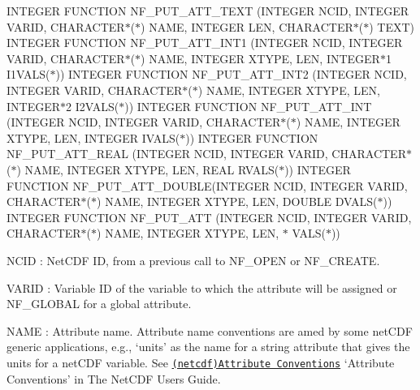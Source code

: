 I\+N\+T\+E\+G\+ER F\+U\+N\+C\+T\+I\+ON N\+F\+\_\+\+P\+U\+T\+\_\+\+A\+T\+T\+\_\+\+T\+E\+XT (I\+N\+T\+E\+G\+ER N\+C\+ID, I\+N\+T\+E\+G\+ER V\+A\+R\+ID, C\+H\+A\+R\+A\+C\+T\+E\+R$\ast$($\ast$) N\+A\+ME, I\+N\+T\+E\+G\+ER L\+EN, C\+H\+A\+R\+A\+C\+T\+E\+R$\ast$($\ast$) T\+E\+XT) I\+N\+T\+E\+G\+ER F\+U\+N\+C\+T\+I\+ON N\+F\+\_\+\+P\+U\+T\+\_\+\+A\+T\+T\+\_\+\+I\+N\+T1 (I\+N\+T\+E\+G\+ER N\+C\+ID, I\+N\+T\+E\+G\+ER V\+A\+R\+ID, C\+H\+A\+R\+A\+C\+T\+E\+R$\ast$($\ast$) N\+A\+ME, I\+N\+T\+E\+G\+ER X\+T\+Y\+PE, L\+EN, I\+N\+T\+E\+G\+E\+R$\ast$1 I1\+V\+A\+L\+S($\ast$)) I\+N\+T\+E\+G\+ER F\+U\+N\+C\+T\+I\+ON N\+F\+\_\+\+P\+U\+T\+\_\+\+A\+T\+T\+\_\+\+I\+N\+T2 (I\+N\+T\+E\+G\+ER N\+C\+ID, I\+N\+T\+E\+G\+ER V\+A\+R\+ID, C\+H\+A\+R\+A\+C\+T\+E\+R$\ast$($\ast$) N\+A\+ME, I\+N\+T\+E\+G\+ER X\+T\+Y\+PE, L\+EN, I\+N\+T\+E\+G\+E\+R$\ast$2 I2\+V\+A\+L\+S($\ast$)) I\+N\+T\+E\+G\+ER F\+U\+N\+C\+T\+I\+ON N\+F\+\_\+\+P\+U\+T\+\_\+\+A\+T\+T\+\_\+\+I\+NT (I\+N\+T\+E\+G\+ER N\+C\+ID, I\+N\+T\+E\+G\+ER V\+A\+R\+ID, C\+H\+A\+R\+A\+C\+T\+E\+R$\ast$($\ast$) N\+A\+ME, I\+N\+T\+E\+G\+ER X\+T\+Y\+PE, L\+EN, I\+N\+T\+E\+G\+ER I\+V\+A\+L\+S($\ast$)) I\+N\+T\+E\+G\+ER F\+U\+N\+C\+T\+I\+ON N\+F\+\_\+\+P\+U\+T\+\_\+\+A\+T\+T\+\_\+\+R\+E\+AL (I\+N\+T\+E\+G\+ER N\+C\+ID, I\+N\+T\+E\+G\+ER V\+A\+R\+ID, C\+H\+A\+R\+A\+C\+T\+E\+R$\ast$($\ast$) N\+A\+ME, I\+N\+T\+E\+G\+ER X\+T\+Y\+PE, L\+EN, R\+E\+AL R\+V\+A\+L\+S($\ast$)) I\+N\+T\+E\+G\+ER F\+U\+N\+C\+T\+I\+ON N\+F\+\_\+\+P\+U\+T\+\_\+\+A\+T\+T\+\_\+\+D\+O\+U\+B\+LE(I\+N\+T\+E\+G\+ER N\+C\+ID, I\+N\+T\+E\+G\+ER V\+A\+R\+ID, C\+H\+A\+R\+A\+C\+T\+E\+R$\ast$($\ast$) N\+A\+ME, I\+N\+T\+E\+G\+ER X\+T\+Y\+PE, L\+EN, D\+O\+U\+B\+LE D\+V\+A\+L\+S($\ast$)) I\+N\+T\+E\+G\+ER F\+U\+N\+C\+T\+I\+ON N\+F\+\_\+\+P\+U\+T\+\_\+\+A\+TT (I\+N\+T\+E\+G\+ER N\+C\+ID, I\+N\+T\+E\+G\+ER V\+A\+R\+ID, C\+H\+A\+R\+A\+C\+T\+E\+R$\ast$($\ast$) N\+A\+ME, I\+N\+T\+E\+G\+ER X\+T\+Y\+PE, L\+EN, $\ast$ V\+A\+L\+S($\ast$))

{\ttfamily N\+C\+ID} \+: Net\+C\+DF ID, from a previous call to N\+F\+\_\+\+O\+P\+EN or N\+F\+\_\+\+C\+R\+E\+A\+TE.

{\ttfamily V\+A\+R\+ID} \+: Variable ID of the variable to which the attribute will be assigned or N\+F\+\_\+\+G\+L\+O\+B\+AL for a global attribute.

{\ttfamily N\+A\+ME} \+: Attribute name. Attribute name conventions are amed by some net\+C\+DF generic applications, e.\+g., ‘units’ as the name for a string attribute that gives the units for a net\+C\+DF variable. See \href{netcdf.html#Attribute-Conventions}{\tt (netcdf)Attribute Conventions} ‘\+Attribute Conventions’ in The Net\+C\+DF Users Guide.

